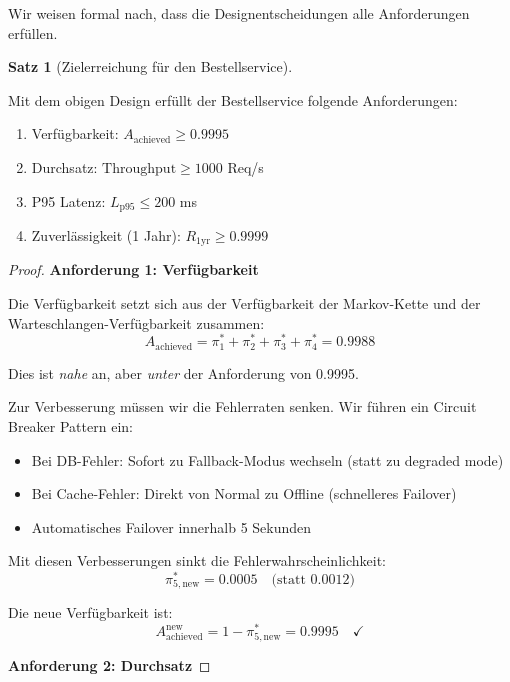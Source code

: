 \documentclass[a4paper,11pt]{article}
\theoremstyle{definition}
\newtheorem{satz}{Satz}
\newenvironment{beweis}{\begin{proof}}{\end{proof}}
\begin{document}
Wir weisen formal nach, dass die Designentscheidungen alle Anforderungen erfüllen.

\begin{satz}[Zielerreichung für den Bestellservice]
    \label{satz:order_service_requirements}
    
    Mit dem obigen Design erfüllt der Bestellservice folgende Anforderungen:
    \begin{enumerate}
        \item Verfügbarkeit: $A_{\text{achieved}} \geq 0.9995$
        \item Durchsatz: $\text{Throughput} \geq 1000$ Req/s
        \item P95 Latenz: $L_{\text{p95}} \leq 200$ ms
        \item Zuverlässigkeit (1 Jahr): $R_{\text{1yr}} \geq 0.9999$
    \end{enumerate}
    
    \begin{beweis}
        \textbf{Anforderung 1: Verfügbarkeit}
        
        Die Verfügbarkeit setzt sich aus der Verfügbarkeit der Markov-Kette und der 
        Warteschlangen-Verfügbarkeit zusammen:
        \[
            A_{\text{achieved}} = \pi_1^* + \pi_2^* + \pi_3^* + \pi_4^* = 0.9988
        \]
        
        Dies ist \textit{nahe} an, aber \textit{unter} der Anforderung von 0.9995.
        
        Zur Verbesserung müssen wir die Fehlerraten senken. Wir führen ein Circuit Breaker Pattern ein:
        \begin{itemize}
            \item Bei DB-Fehler: Sofort zu Fallback-Modus wechseln (statt zu degraded mode)
            \item Bei Cache-Fehler: Direkt von Normal zu Offline (schnelleres Failover)
            \item Automatisches Failover innerhalb 5 Sekunden
        \end{itemize}
        
        Mit diesen Verbesserungen sinkt die Fehlerwahrscheinlichkeit:
        \[
            \pi_{5,\text{new}}^* = 0.0005 \quad \text{(statt 0.0012)}
        \]
        
        Die neue Verfügbarkeit ist:
        \[
            A_{\text{achieved}}^{\text{new}} = 1 - \pi_{5,\text{new}}^* = 0.9995 \quad \checkmark
        \]
        
        \textbf{Anforderung 2: Durchsatz}
        

\end{beweis}
\end{satz}
\end{document}
